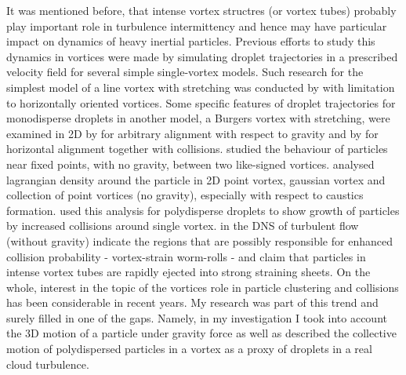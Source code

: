 \documentclass[../main.tex]{subfiles}
\begin{document}
It was mentioned before, that intense vortex structres (or vortex tubes) probably play important role in turbulence intermittency and hence may have particular impact on dynamics of heavy inertial particles. Previous efforts to study this dynamics in vortices were made by simulating droplet trajectories in a prescribed velocity field for several simple single-vortex models. Such research for the simplest model of a line vortex with stretching was conducted by \citet{Markowicz2000} with limitation to horizontally oriented vortices. Some specific features of droplet trajectories for monodisperse droplets in another model, a Burgers vortex with stretching, were examined in 2D by \citet{Marcu1995} for arbitrary alignment with respect to gravity and by \citet{Hill2005} for horizontal alignment together with collisions. \citet{Ravichandran2014} studied the behaviour of particles near fixed points, with no gravity, between two like-signed vortices. \citet{Ravichandran2015} analysed lagrangian density around the particle in 2D point vortex, gaussian vortex and collection of point vortices (no gravity), especially with respect to caustics formation. \citep{Deepu2017} used this analysis for polydisperse droplets to show growth of particles by increased collisions around single vortex.  \citet{Picardo2019} in the DNS of turbulent flow (without gravity) indicate the regions that are possibly responsible for enhanced collision probability - vortex-strain worm-rolls - and claim that particles in intense vortex tubes are rapidly ejected into strong straining sheets. On the whole, interest in the topic of the vortices role in particle clustering and collisions has been considerable in recent years. My research was part of this trend and surely filled in one of the gaps. Namely, in my investigation I took into account the 3D motion of a particle under gravity force as well as described the collective motion of polydispersed particles in a vortex as a proxy of droplets in a real cloud turbulence.\\
\end{document}
